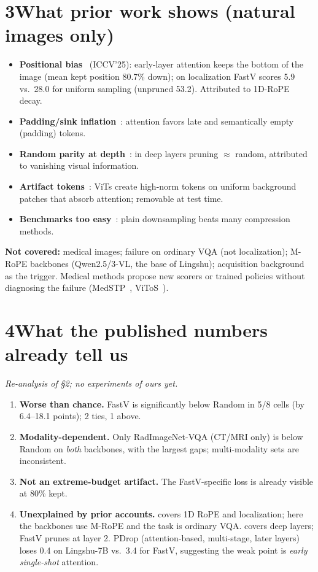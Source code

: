 \documentclass[11pt]{article}
\begin{document}
\section*{3\quad What prior work shows (natural images only)}
\begin{itemize}
  \item \textbf{Positional bias}~\cite{feather} (ICCV'25): early-layer attention keeps the bottom
        of the image (mean kept position 80.7\% down); on localization FastV scores 5.9 vs.\ 28.0
        for uniform sampling (unpruned 53.2). Attributed to 1D-RoPE decay.
  \item \textbf{Padding/sink inflation}~\cite{pore}: attention favors late and semantically
        empty (padding) tokens.
  \item \textbf{Random parity at depth}~\cite{randtok}: in deep layers pruning $\approx$ random,
        attributed to vanishing visual information.
  \item \textbf{Artifact tokens}~\cite{registers,ttreg}: ViTs create high-norm tokens on uniform
        background patches that absorb attention; removable at test time.
  \item \textbf{Benchmarks too easy}~\cite{vtcbench}: plain downsampling beats many compression
        methods.
\end{itemize}
\textbf{Not covered:} medical images; failure on ordinary VQA (not localization); M-RoPE
backbones (Qwen2.5/3-VL, the base of Lingshu); acquisition background as the trigger. Medical
methods propose new scorers or trained policies without diagnosing the failure
(MedSTP~\cite{medstp}, ViToS~\cite{vitos}).

\section*{4\quad What the published numbers already tell us}
\emph{Re-analysis of \S2; no experiments of ours yet.}
\begin{enumerate}[label=\textbf{D\arabic*}]
  \item \textbf{Worse than chance.} FastV is significantly below Random in 5/8 cells (by
        6.4--18.1 points); 2 ties, 1 above.
  \item \textbf{Modality-dependent.} Only RadImageNet-VQA (CT/MRI only) is below Random on
        \emph{both} backbones, with the largest gaps; multi-modality sets are inconsistent.
  \item \textbf{Not an extreme-budget artifact.} The FastV-specific loss is already visible at
        80\% kept.
  \item \textbf{Unexplained by prior accounts.} \cite{feather} covers 1D RoPE and localization;
        here the backbones use M-RoPE and the task is ordinary VQA. \cite{randtok} covers deep
        layers; FastV prunes at layer 2. PDrop (attention-based, multi-stage, later layers)
        loses 0.4 on Lingshu-7B vs.\ 3.4 for FastV, suggesting the weak point is \emph{early
        single-shot} attention.
\end{enumerate}
\end{document}
